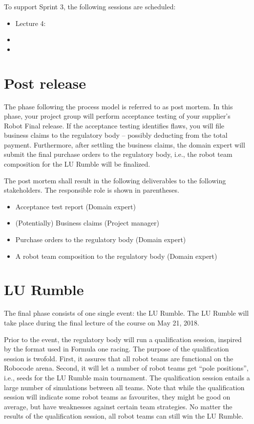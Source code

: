 \documentclass{scrreprt}
\begin{document}
To support Sprint 3, the following sessions are scheduled:
\begin{itemize}
\item Lecture 4:
\item 
\item 
\end{itemize}

\section{Post release}
The phase following the process model is referred to as post mortem. In this phase, your project group will perform acceptance testing of your supplier's Robot Final release. If the acceptance testing identifies flaws, you will file business claims to the regulatory body -- possibly deducting from the total payment. Furthermore, after settling the business claims, the domain expert will submit the final purchase orders to the regulatory body, i.e., the robot team composition for the LU Rumble will be finalized.

The post mortem shall result in the following deliverables to the following stakeholders. The responsible role is shown in parentheses.
\begin{itemize}
\item Acceptance test report (Domain expert)
\item (Potentially) Business claims (Project manager)
\item Purchase orders to the regulatory body (Domain expert)
\item A robot team composition to the regulatory body (Domain expert)
\end{itemize}

\section{LU Rumble}
The final phase consists of one single event: the LU Rumble. The LU Rumble will take place during the final lecture of the course on May 21, 2018.

Prior to the event, the regulatory body will run a qualification session, inspired by the format used in Formula one racing. The purpose of the qualification session is twofold. First, it assures that all robot teams are functional on the Robocode arena. Second, it will let a number of robot teams get ``pole positions'', i.e., seeds for the LU Rumble main tournament. The qualification session entails a large number of simulations between all teams. Note that while the qualification session will indicate some robot teams as favourites, they might be good on average, but have weaknesses against certain team strategies. No matter the results of the qualification session, all robot teams can still win the LU Rumble.  
\end{document}
